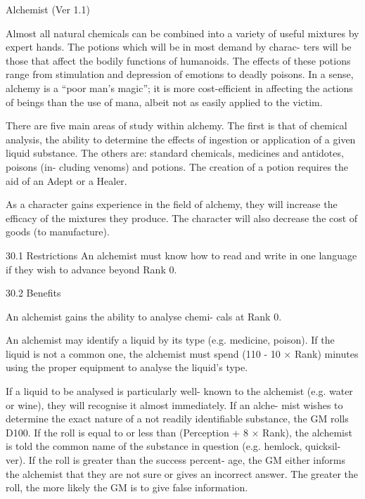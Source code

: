 \begin{Chapter}{Alchemist (Ver 1.1)}

Almost all natural chemicals can be combined into 
a  variety  of  useful  mixtures  by  expert  hands.  The 
potions  which  will  be  in  most  demand  by  charac-
ters will be those that affect the bodily functions of 
humanoids. The effects of these potions range from 
stimulation  and  depression  of  emotions  to  deadly 
poisons.  In  a  sense,  alchemy  is  a  “poor  man’s 
magic”;  it  is  more  cost-efficient  in  affecting  the 
actions of beings than the use of mana, albeit not as 
easily applied to the victim. 

There are five main areas of study within alchemy. 
The first is that of chemical analysis, the ability to 
determine the effects of ingestion or application of 
a  given  liquid  substance.  The  others  are:  standard 
chemicals,  medicines  and  antidotes,  poisons  (in-
cluding  venoms)  and  potions.  The  creation  of  a 
potion requires the aid of an Adept or a Healer. 

As  a  character  gains  experience  in  the  field  of 
alchemy,  they  will  increase  the  efficacy  of  the 
mixtures  they  produce.  The  character  will  also 
decrease the cost of goods (to manufacture). 

30.1 Restrictions 
An alchemist must know how to read and write in 
one language if they wish to advance beyond Rank 
0. 

30.2 Benefits 

An alchemist gains the ability to analyse chemi-
cals at Rank 0. 

An alchemist may identify a liquid by its type (e.g. 
medicine,  poison).  If  the  liquid  is  not  a  common 
one,  the  alchemist  must  spend  (110  -  10  ×  Rank) 
minutes using the proper equipment to analyse the 
liquid’s type. 

If  a  liquid  to  be  analysed  is  particularly  well-
known  to  the  alchemist  (e.g.  water  or  wine),  they 
will  recognise  it  almost  immediately.  If  an  alche-
mist  wishes to  determine  the  exact nature  of  a  not 
readily  identifiable  substance,  the  GM  rolls  D100. 
If the roll is equal to or less than (Perception + 8 × 
Rank),  the  alchemist  is  told  the  common  name  of 
the  substance  in  question  (e.g.  hemlock,  quicksil-
ver). If the roll is greater than the success percent-
age, the GM either informs the alchemist that they 
are  not  sure  or  gives  an  incorrect  answer.  The 
greater  the  roll,  the  more  likely  the  GM  is  to  give 
false information. 


\end{Chapter}
